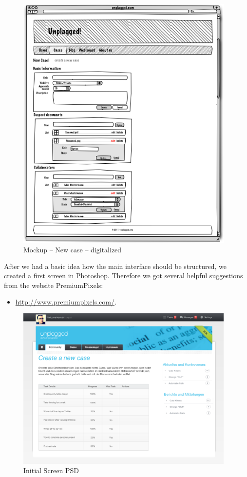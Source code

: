 \begin{figure}[htbp]
  \centering
    \includegraphics[width=0.97\textwidth , bb = 0 250 490 560,clip]{mockups/1_new_case.png}
  \caption{Mockup -- New case -- digitalized}
  \label{fig:1newCaseMockup}
\end{figure}


After we had a basic idea how the main interface should be structured, we created a first screen in Photoshop. Therefore 
we got several helpful suggestions from the website PremiumPixels: 

\begin{itemize}
\item \url{http://www.premiumpixels.com/}.
\end{itemize}

\begin{figure}[htbp]
  \centering
    \includegraphics[width=0.97\textwidth]{images/init-psd.png}
  \caption{Initial Screen PSD}
  \label{fig:initialScreenPsd}
\end{figure}


